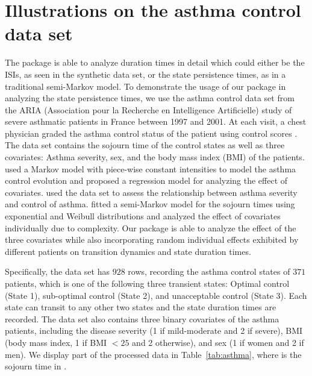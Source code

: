 \section{Illustrations on the asthma control data set}\label{sec:asthma}
{The  package is able to analyze duration times in detail which could either be the ISIs, as seen in the synthetic  data set, or the state persistence times, as in a traditional semi-Markov model. 
To demonstrate the usage of our package in analyzing the state persistence times, we use the asthma control data set from the ARIA (Association pour la Recherche en Intelligence Artificielle) study of  severe asthmatic patients \citep{combescure2003assessment} in France between 1997 and 2001. 
At each visit, a chest physician graded the asthma control status of the patient using control scores \citep{juniper1999development}.  
The data set contains the sojourn time of the control states as well as three  covariates: Asthma severity, sex, and the body mass index (BMI) of the patients. 
\citet{saint2003analysis} used a Markov model with piece-wise constant intensities to model the asthma control evolution and proposed a regression model for analyzing the effect of covariates.
\citet{combescure2003assessment} used the data set to assess the relationship between asthma severity and control of asthma.
\citet{listwon2015semimarkov} fitted a semi-Markov model for the sojourn times using exponential and Weibull distributions and analyzed the effect of covariates individually due to complexity. 
Our  package is able to analyze the effect of the three covariates while also incorporating random individual effects exhibited by different patients on transition dynamics and state duration times. }

Specifically, the data set has $928$ rows, recording the asthma control states of $371$ patients, which is one of the following three transient states:  Optimal control (State 1), sub-optimal control (State 2), and unacceptable control (State 3). 
Each state can transit to any other two states and the state duration times are recorded. 
The data set also contains three binary covariates of the asthma patients, including the disease severity (1 if mild-moderate and 2 if severe), BMI (body mass index, 1 if BMI $<25$ and 2 otherwise), and sex (1 if women and 2 if men). 
We display part of the processed data in Table~\ref{tab:asthma}, where  is the sojourn time in .


